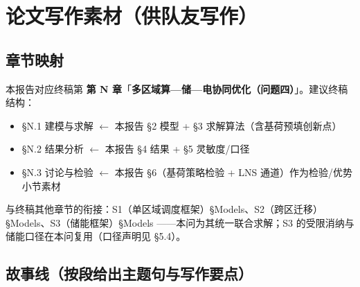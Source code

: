 \documentclass{internal-report}
\begin{document}
\section{论文写作素材（供队友写作）}
\label{sec:material}

\subsection{章节映射}

本报告对应终稿第 \textbf{第 N 章}「\textbf{多区域算—储—电协同优化（问题四）}」。建议终稿结构：
\begin{itemize}
  \item §N.1 建模与求解 \quad $\leftarrow$ 本报告 §2 模型 + §3 求解算法（含基荷预填创新点）
  \item §N.2 结果分析 \quad $\leftarrow$ 本报告 §4 结果 + §5 灵敏度/口径
  \item §N.3 讨论与检验 \quad $\leftarrow$ 本报告 §6（基荷策略检验 + LNS 通道）作为检验/优势小节素材
\end{itemize}
与终稿其他章节的衔接：S1（单区域调度框架）§Models、S2（跨区迁移）§Models、S3（储能框架）§Models
——本问为其统一联合求解；S3 的受限消纳与储能口径在本问复用（口径声明见 §5.4）。

\subsection{故事线（按段给出主题句与写作要点）}
\end{document}

